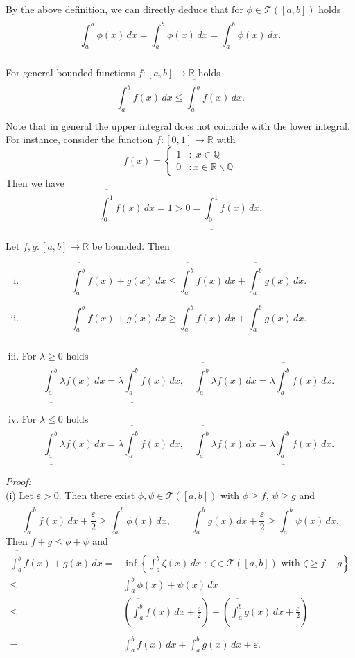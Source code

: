 By the above definition, we can directly deduce that for $\phi\in\mathcal{T}([a,b])$ holds
\[\overline{\int_a^b}\phi(x)\, dx=\underline{\int_a^b}\phi(x)\, dx={\int_a^b}\phi(x)\, dx.\]

For general bounded functions $f:[a,b]\to\mathbb{R}$ holds
\[\underline{\int_a^b}f(x)\, dx\leq \overline{\int_a^b}f(x)\, dx.\]
Note that in general the upper integral does not coincide with the lower integral. For instance, consider the function $f: [0,1] \to\mathbb{R}$
with
\[f(x)=\begin{cases}1&:\;x\in\mathbb{Q}\\0&:x\in\mathbb{R}\backslash\mathbb{Q}\end{cases}\]
Then we have
\[\overline{\int_0^1}f(x)\, dx=1>0=\underline{\int_0^1}f(x)\, dx.\]
\begin{Theorem}{}
Let $f,g:[a,b]\to\mathbb{R}$ be bounded. Then
\begin{enumerate}[(i)]
\item
\[\overline{\int_a^b}f(x)+g(x)\, dx\leq \overline{\int_a^b}f(x)\, dx+\overline{\int_a^b}g(x)\, dx.\]
\item
\[\underline{\int_a^b}f(x)+g(x)\, dx\geq \underline{\int_a^b}f(x)\, dx+\underline{\int_a^b}g(x)\, dx.\]
\item For $\lambda\geq0$ holds
\[\underline{\int_a^b}\lambda f(x)\, dx=\lambda \underline{\int_a^b}f(x)\, dx,\quad\overline{\int_a^b}\lambda f(x)\, dx=\lambda \overline{\int_a^b}f(x)\, dx.\]
\item For $\lambda\leq0$ holds
\[\underline{\int_a^b}\lambda f(x)\, dx=\lambda \overline{\int_a^b}f(x)\, dx,\quad\overline{\int_a^b}\lambda f(x)\, dx=\lambda \underline{\int_a^b}f(x)\, dx.\]
\end{enumerate}
\end{Theorem}
{\em Proof:}\\
(i) Let $\varepsilon>0$. Then there exist $\phi,\psi\in\mathcal{T}([a,b])$ with $\phi\geq f$, $\psi\geq g$ and
\[
\overline{\int_a^b}f(x)\, dx+\frac\varepsilon2\geq{\int_a^b}\phi(x)\, dx,\qquad
\overline{\int_a^b}g(x)\, dx+\frac\varepsilon2\geq{\int_a^b}\psi(x)\, dx.
\]
Then $f+g\leq\phi+\psi$ and
\[
\begin{aligned}
\overline{\int_a^b}f(x)+g(x)\, dx=&\inf\left\{\int_a^b\zeta(x)\, dx\;:\; \zeta\in\mathcal{T}([a,b])\text{ with }\zeta\geq f+g\right\}\\
\leq& {\int_a^b}\phi(x)+\psi(x)\, dx\\ \leq&
\left(\overline{\int_a^b}f(x)\, dx+\frac\varepsilon2\right)+\left(\overline{\int_a^b}g(x)\, dx+\frac\varepsilon2\right)\\=&
\overline{\int_a^b}f(x)\, dx+\overline{\int_a^b}g(x)\, dx+\varepsilon.
\end{aligned}
\]
